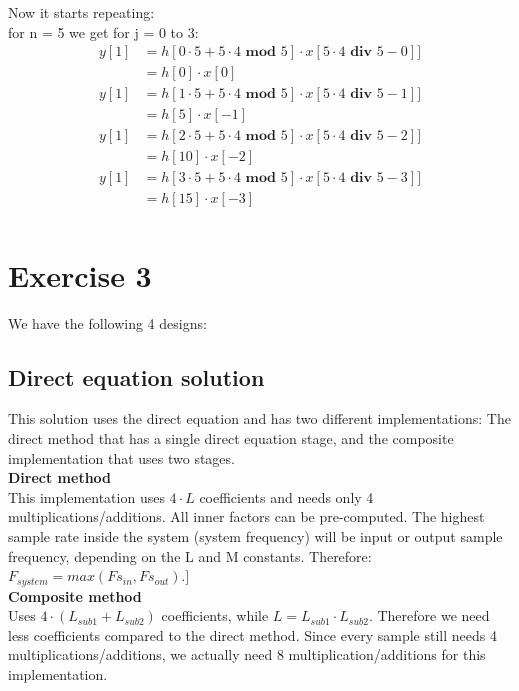\documentclass[a4paper,twoside,11pt, fleqn]{article}
\begin{document}
Now it starts repeating:\\

for n = 5 we get for j = 0 to 3:
\begin{align}
y[1] &= h[0\cdot 5 + 5\cdot 4 \textbf{ mod } 5]\cdot x[5\cdot 4 \textbf{ div } 5 - 0]]\\ 
&= h[0]\cdot x[0] \\
y[1] &= h[1\cdot 5 + 5\cdot 4 \textbf{ mod } 5]\cdot x[5\cdot 4 \textbf{ div } 5 - 1]] \\
&= h[5]\cdot x[-1] \\
y[1] &= h[2\cdot 5 + 5\cdot 4 \textbf{ mod } 5]\cdot x[5\cdot 4 \textbf{ div } 5 - 2]] \\
&= h[10]\cdot x[-2] \\
y[1] &= h[3\cdot 5 + 5\cdot 4 \textbf{ mod } 5]\cdot x[5\cdot 4 \textbf{ div } 5 - 3]] \\
&= h[15]\cdot x[-3] \\
\end{align}


\newpage
\section{Exercise 3}
We have the following 4 designs: 

\subsection{Direct equation solution}
This solution uses the direct equation and has two different implementations: The direct method that has a single direct equation stage, and the composite implementation that uses two stages.\\

\textbf{Direct method}\\
This implementation uses $4\cdot L$ coefficients and needs only 4 multiplications/additions. All inner factors can be pre-computed.
\smallskip
The highest sample rate inside the system (system frequency) will be input or output sample frequency, depending on the L and M constants. Therefore: $F_{system} = max(Fs_{in}, Fs_{out})$.]\\
 
\textbf{Composite method}\\
Uses $4\cdot (L_{sub1} + L_{sub2})$ coefficients, while $L = L_{sub1} \cdot L_{sub2}$. Therefore we need less coefficients compared to the direct method. Since every sample still needs 4 multiplications/additions, we actually need 8 multiplication/additions for this implementation.
\end{document}
